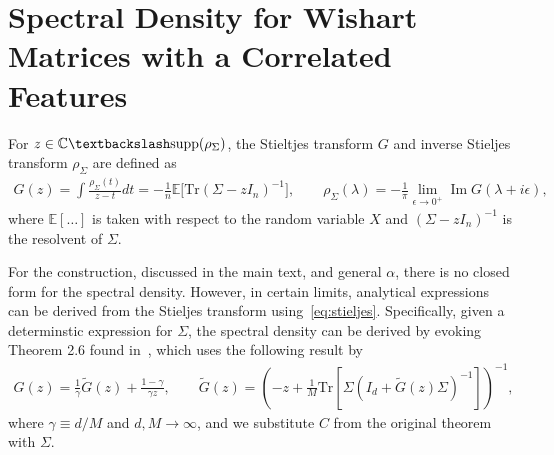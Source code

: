 \documentclass{article}
\DeclareMathOperator{\im}{Im}
\DeclareMathOperator{\tr}{tr}
\def\tr{\textrm{Tr}}
\begin{document}
\section{Spectral Density for Wishart Matrices with a Correlated Features}
\label{sec:wishart_density}


For $z \in \mathbb{C} \textbackslash \text{supp}( \rho_\Sigma)$, the Stieltjes transform $G$ and inverse Stieljes transform $\rho_\Sigma$ are defined as
\begin{align}
\label{eq:stieljes}
    G(z)
     = 
     \int \frac{\rho_\Sigma(t)}{z-t}dt
    =
    -\frac{1}{n}\mathbb{E}
    \big[
     \tr (\Sigma- z I_n )^{-1}
    \big],
    \qquad 
        \rho_\Sigma(\lambda)
    =
    -\frac{1}{\pi}
    \lim_{\epsilon \to 0^+}
    \im
    G(\lambda+ i \epsilon),    
\end{align}
where $\mathbb{E}[\ldots]$ is taken with respect to the random variable $X$ and $(\Sigma- z I_n )^{-1}$
is the resolvent of $\Sigma$. 

For the construction, discussed in the main text, and general $\alpha$, there is no closed form for the spectral density. However, in certain limits, analytical expressions can be derived from the Stieljes transform using~\cref{eq:stieljes}. 
Specifically, given a determinstic expression for $\Sigma$, the spectral density can be derived by evoking Theorem 2.6 found in~\citet{couillet_liao_2022}, which uses the following result by~\citet{silverstein1995empirical}
\begin{align}
\label{eq:stiel_cov}
    G(z) = \frac{1}{\gamma}\tilde{G}(z)
    +
    \frac{1-\gamma }{\gamma z}, 
    \qquad
    \tilde{G}(z)
    =
    \left(
    -z + \frac{1}{M}
    \tr \left[ \Sigma (I_d + \tilde{G}(z) \Sigma )^{-1} \right]
    \right)^{-1},
\end{align}
where $\gamma \equiv d/M$ and $d,M \to \infty$, and we substitute $C$ from the original theorem with $\Sigma$.
\end{document}
